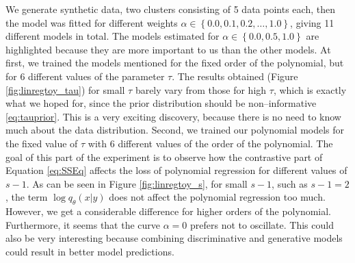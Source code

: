 We generate synthetic data, two clusters consisting of 5 data points each, then the model was fitted for different weights $\alpha \in \left\{0.0, 0.1, 0.2,\dots,1.0\right\}$, giving 11 different models in total. The models estimated for $\alpha \in \left\{0.0, 0.5, 1.0 \right\}$ are highlighted because they are more important to us than the other models.
At first, we trained the models mentioned for the fixed order of the polynomial, but for 6 different values of the parameter $\tau$. The results obtained (Figure \ref{fig:linregtoy_tau}) for small $\tau$ barely vary from those for high $\tau$, which is exactly what we hoped for, since the prior distribution should be non--informative \eqref{eq:tauprior}.  This is a very exciting discovery, because there is no need to know much about the data distribution. Second, we trained our polynomial models for the fixed value of $\tau$ with 6 different values of the order of the polynomial. The goal of this part of the experiment is to observe how the contrastive part of Equation \eqref{eq:SSEq} affects the loss of polynomial regression for different values of $s-1$. As can be seen in Figure \ref{fig:linregtoy_s}, for small $s-1$, such as $s-1 = 2$, the term $\log q_{\theta}\left(x|y\right)$ does not affect the polynomial regression too much. However, we get a considerable difference for higher orders of the polynomial. Furthermore, it seems that the curve $\alpha = 0$ prefers not to oscillate. This could also be very interesting because combining discriminative and generative models could result in better model predictions.    

